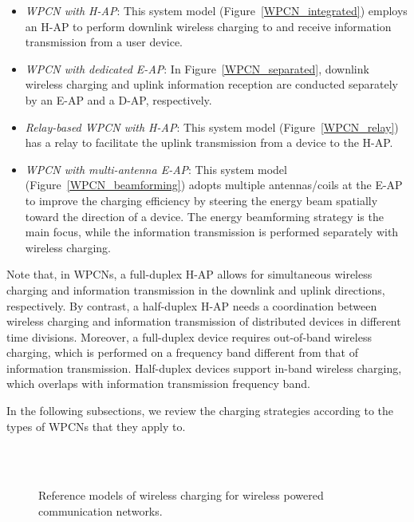 \documentclass[twocolumn,10pt]{IEEEtran}
\begin{document}
\begin{itemize}

\item {\em WPCN with H-AP}: This system model (Figure~\ref{WPCN_integrated}) employs an H-AP to perform downlink wireless charging to and receive information transmission from a user device. 
\item {\em WPCN with dedicated E-AP}: In Figure~\ref{WPCN_separated}, downlink wireless charging and uplink information reception are conducted separately by an E-AP and a D-AP, respectively. 

\item {\em Relay-based WPCN with H-AP}:  This system model (Figure~\ref{WPCN_relay}) has a relay to facilitate the uplink transmission from a device to the H-AP. 

\item {\em WPCN with multi-antenna E-AP}: This system model (Figure~\ref{WPCN_beamforming}) adopts multiple antennas/coils at the E-AP to improve the charging efficiency by steering the energy beam spatially toward the direction of a device. The energy beamforming strategy is the main focus, while the information transmission is performed separately with wireless charging.

\end{itemize}
Note that, in WPCNs, a full-duplex H-AP allows for simultaneous wireless charging and information transmission in the downlink and uplink directions, respectively. By contrast, a half-duplex H-AP needs a coordination between wireless charging and information transmission of distributed devices in different time divisions. Moreover, a full-duplex device requires out-of-band wireless charging, which is performed on a frequency band different from that of information transmission. Half-duplex devices support in-band wireless charging, which overlaps with information transmission frequency band. 

In the following subsections, we review the charging strategies according to the types of WPCNs that they apply to.  

\begin{figure*} 
\centering
\centering
{}  \\
 \centering 
\centering
 \\
\centering
\caption{Reference models of wireless charging for wireless powered communication networks.} 
\label{static_charger_scheduling}
\end{figure*}
\end{document}
